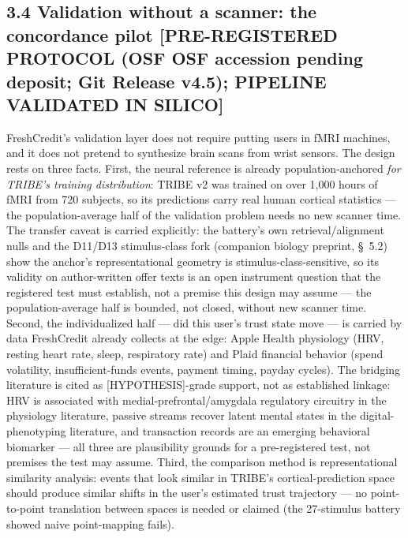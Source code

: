 \documentclass[11pt,twocolumn]{article}
\begin{document}
\subsection*{3.4 Validation without a scanner: the concordance pilot [PRE-REGISTERED PROTOCOL (OSF OSF accession pending deposit; Git Release v4.5); PIPELINE VALIDATED IN SILICO]}

FreshCredit's validation layer does not require putting users in fMRI machines, and it does not pretend to synthesize brain scans from wrist sensors. The design rests on three facts. First, the neural reference is already population-anchored \emph{for TRIBE's training distribution}: TRIBE v2 was trained on over 1,000 hours of fMRI from 720 subjects, so its predictions carry real human cortical statistics --- the population-average half of the validation problem needs no new scanner time. The transfer caveat is carried explicitly: the battery's own retrieval/alignment nulls and the D11/D13 stimulus-class fork (companion biology preprint, \S~5.2) show the anchor's representational geometry is stimulus-class-sensitive, so its validity on author-written offer texts is an open instrument question that the registered test must establish, not a premise this design may assume --- the population-average half is bounded, not closed, without new scanner time. Second, the individualized half --- did this user's trust state move --- is carried by data FreshCredit already collects at the edge: Apple Health physiology (HRV, resting heart rate, sleep, respiratory rate) and Plaid financial behavior (spend volatility, insufficient-funds events, payment timing, payday cycles). The bridging literature is cited as [HYPOTHESIS]-grade support, not as established linkage: HRV is associated with medial-prefrontal/amygdala regulatory circuitry in the physiology literature, passive streams recover latent mental states in the digital-phenotyping literature, and transaction records are an emerging behavioral biomarker --- all three are plausibility grounds for a pre-registered test, not premises the test may assume. Third, the comparison method is representational similarity analysis: events that look similar in TRIBE's cortical-prediction space should produce similar shifts in the user's estimated trust trajectory --- no point-to-point translation between spaces is needed or claimed (the 27-stimulus battery showed naive point-mapping fails).
\end{document}
